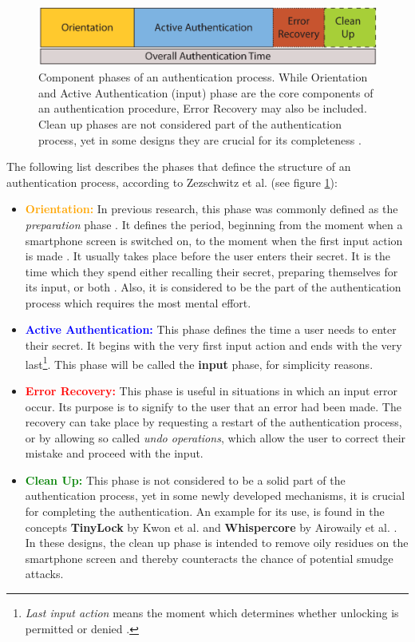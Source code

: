 \begin{figure}[t!]
\centering
\includegraphics[width=13cm, height=2cm]{Chapters/graphics/Phases.PNG}
\caption{Component phases of an authentication process. While Orientation and Active Authentication (input) phase are the core components of an authentication procedure, Error Recovery may also be included. Clean up phases are not considered part of the authentication process, yet in some designs they are crucial for its completeness \cite{Zezschwitz}. }
\label{fig:phases}
\end{figure}

The following list describes the phases that defince the structure of an authentication process, according to Zezschwitz et al. \cite{Zezschwitz} (see figure \ref{fig:phases}):

\begin{itemize}
    \item \textbf{\textcolor{orange}{Orientation:}} In previous research, this phase was commonly defined as the \textit{preparation} phase . It defines the period, beginning from the moment when a smartphone screen is switched on, to the moment when the first input action is made . It usually takes place before the user enters their secret. It is the time which they spend either recalling their secret, preparing themselves for its input, or both . Also, it is considered to be the part of the authentication process which requires the most mental effort.  
    \item \textbf{\textcolor{blue}{Active Authentication:}} This phase defines the time a user needs to enter their secret. It begins with the very first input action and ends with the very last\footnote{ \textit{Last input action} means the moment which determines whether unlocking is permitted or denied \cite{Zezschwitz}.}. This phase will be called the \textbf{input} phase, for simplicity reasons.
    \item \textbf{\textcolor{red}{Error Recovery:}} This phase is useful in situations in which an input error occur. Its purpose is to signify to the user that an error had been made. The recovery can take place by requesting a restart of the authentication process, or by allowing so called \textit{undo operations}, which allow the user to correct their mistake and proceed with the input. 
    \item \textbf{\textcolor{green}{Clean Up:}} This phase is not considered to be a solid part of the authentication process, yet in some newly developed mechanisms, it is crucial for completing the authentication. An example for its use, is found in the concepts \textbf{TinyLock} by Kwon et al. \cite{kwon} and \textbf{Whispercore} by Airowaily et al. \cite{Airowaily}. In these designs, the clean up phase is intended to remove oily residues on the smartphone screen and thereby counteracts the chance of potential smudge attacks. 
\end{itemize}

